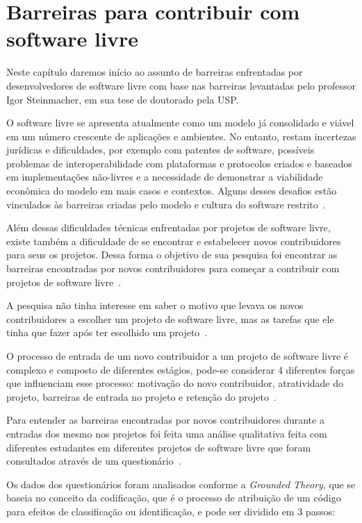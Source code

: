 \chapter{Barreiras para contribuir com software livre}

Neste capítulo daremos início ao assunto de barreiras enfrentadas por desenvolvedores
de software livre com base nas barreiras levantadas pelo professor Igor Steinmacher, 
em sua tese de doutorado pela USP.

O software livre se apresenta atualmente como um modelo já consolidado e viável
em um número crescente de aplicações e ambientes. No entanto, restam incertezas
jurídicas e dificuldades, por exemplo com patentes de software, possíveis problemas de
interoperabilidade com plataformas e protocolos criados e baseados em implementações
não-livres e a necessidade de demonstrar a viabilidade econômica do modelo em mais
casos e contextos. Alguns desses desafios estão vinculados às barreiras criadas pelo
modelo e cultura do software restrito~\cite{kon2012software}.

Além dessas dificuldades técnicas enfrentadas por projetos de software livre, existe 
também a dificuldade de se encontrar e estabelecer novos contribuidores para seus os
projetos. Dessa forma o objetivo de sua pesquisa foi encontrar as barreiras encontradas 
por novos contribuidores para começar a contribuir com projetos de software livre~\cite{Steinmacher:2015:SLR:2729291.2729410}.

A pesquisa não tinha interesse em saber o motivo que levava os novos contribuidores
a escolher um projeto de software livre, mas as tarefas que ele tinha que fazer após
ter escolhido um projeto~\cite{Steinmacher:2015:SLR:2729291.2729410}.

O processo de entrada de um novo contribuidor a um projeto de software livre é complexo
e composto de diferentes estágios, pode-se considerar 4 diferentes forças que influenciam 
esse processo: motivação do novo contribuidor, atratividade do projeto, barreiras de entrada
no projeto e retenção do projeto~\cite{Steinmacher:2014:HLO:2593702.2593704, 2049}.

Para entender as barreiras encontradas por novos contribuidores durante a entradas dos
mesmo nos projetos foi feita uma análise qualitativa feita com diferentes estudantes em
diferentes projetos de software livre que foram consultados através de um questionário~\cite{Steinmacher:2014:HLO:2593702.2593704}.

Os dados dos questionários foram analisados conforme a \textit{Grounded Theory},
que se baseia no conceito da codificação, que é o processo de atribuição de um código
para efeitos de classificação ou identificação, e pode ser dividido em 3 passos:

